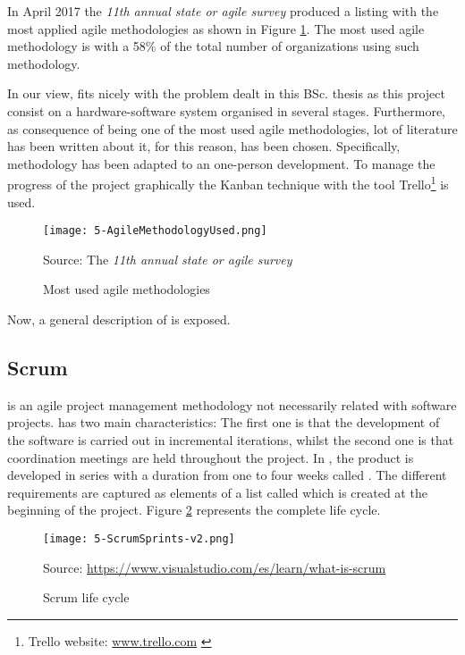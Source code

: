 In April 2017 the \emph{11th annual state or agile survey} \cite{AnualStateAgile} produced a listing with the most applied agile methodologies as shown in Figure \ref{fig:5-AgileMethodologyUsed}. The most used agile methodology is  with a 58\% of the total number of organizations using such methodology.

In our view,  fits nicely with the problem dealt in this \ac{BSc.} thesis as this project consist on a hardware-software system organised in several stages. Furthermore, as consequence of being one of the most used agile methodologies, lot of literature has been written about it, for this reason,  has been chosen. Specifically,  methodology \cite{ScrumGuide} has been adapted to an one-person development. To manage the progress of the project graphically the Kanban technique with the tool Trello\footnote{Trello website: \url{www.trello.com} \label{footnote-1}} is used.

\begin{figure}[!h]
	\begin{center}
		\texttt{[image: 5-AgileMethodologyUsed.png]}
		\caption{Most used agile methodologies}{Source: The \emph{11th annual state or agile survey}}
		\label{fig:5-AgileMethodologyUsed}
	\end{center}
\end{figure}

Now, a general description of  is exposed.


\subsection{Scrum}

 \cite{ScrumGuide} is an agile project management methodology not necessarily related with software projects.  has two main characteristics: The first one is that the development of the software is carried out in incremental iterations, whilst the second one is that coordination meetings are held throughout the project.
In , the product is developed in series with a duration from one to four weeks called . The different requirements are captured as elements of a list called  which is created at the beginning of the project. Figure \ref{fig:5-ScrumSprints} represents the complete  life cycle.

\begin{figure}[!h]
	\begin{center}
		\texttt{[image: 5-ScrumSprints-v2.png]}	
		\caption{Scrum life cycle}{Source: \url{https://www.visualstudio.com/es/learn/what-is-scrum}}
		\label{fig:5-ScrumSprints}
	\end{center}
\end{figure}


